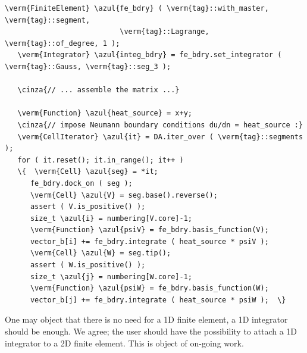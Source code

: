 \begin{Verbatim}[commandchars=\\\{\},formatcom=\small\tt,frame=single,
   label=parag-\ref{\numb section 6.\numb parag 3}.cpp,rulecolor=\color{coment},
   baselinestretch=0.94,framesep=2mm                                            ]
   \verm{FiniteElement} \azul{fe_bdry} ( \verm{tag}::with_master, \verm{tag}::segment,
                           \verm{tag}::Lagrange, \verm{tag}::of_degree, 1 );
   \verm{Integrator} \azul{integ_bdry} = fe_bdry.set_integrator ( \verm{tag}::Gauss, \verm{tag}::seg_3 );

   \cinza{// ... assemble the matrix ...}

   \verm{Function} \azul{heat_source} = x+y;
   \cinza{// impose Neumann boundary conditions du/dn = heat_source :}
   \verm{CellIterator} \azul{it} = DA.iter_over ( \verm{tag}::segments );
   for ( it.reset(); it.in_range(); it++ )
   \{  \verm{Cell} \azul{seg} = *it;
      fe_bdry.dock_on ( seg );
      \verm{Cell} \azul{V} = seg.base().reverse();
      assert ( V.is_positive() );
      size_t \azul{i} = numbering[V.core]-1;
      \verm{Function} \azul{psiV} = fe_bdry.basis_function(V);
      vector_b[i] += fe_bdry.integrate ( heat_source * psiV );
      \verm{Cell} \azul{W} = seg.tip();
      assert ( W.is_positive() );
      size_t \azul{j} = numbering[W.core]-1;
      \verm{Function} \azul{psiW} = fe_bdry.basis_function(W);
      vector_b[j] += fe_bdry.integrate ( heat_source * psiW );  \}
\end{Verbatim}

One may object that there is no need for a 1D finite element, a 1D integrator should be enough.
We agree; the user should have the possibility to attach a 1D integrator to a 2D finite element.
This is object of on-going work.
